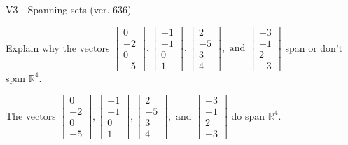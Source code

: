 \begin{exercise}
  \begin{exerciseTitle}V3 - Spanning sets (ver. 636)\end{exerciseTitle}
  \begin{exerciseStatement}
    Explain why the vectors \(\left[\begin{array}{r}
0 \\
-2 \\
0 \\
-5
\end{array}\right] , \left[\begin{array}{r}
-1 \\
-1 \\
0 \\
1
\end{array}\right] , \left[\begin{array}{r}
2 \\
-5 \\
3 \\
4
\end{array}\right] , \text{ and } \left[\begin{array}{r}
-3 \\
-1 \\
2 \\
-3
\end{array}\right]\) span or don't span \(\mathbb{R}^4\). 
	


  \end{exerciseStatement}
  \begin{exerciseAnswer}
   The vectors \(\left[\begin{array}{r}
0 \\
-2 \\
0 \\
-5
\end{array}\right] , \left[\begin{array}{r}
-1 \\
-1 \\
0 \\
1
\end{array}\right] , \left[\begin{array}{r}
2 \\
-5 \\
3 \\
4
\end{array}\right] , \text{ and } \left[\begin{array}{r}
-3 \\
-1 \\
2 \\
-3
\end{array}\right]\) 
  	 do  
	span \(\mathbb{R}^4\).
  


  \end{exerciseAnswer}
\end{exercise}